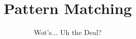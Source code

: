 \documentclass{beamer}
\title{Pattern Matching}
\subtitle{Wot's... Uh the Deal?}
\date{}
\begin{document}
\frame{\titlepage}
\end{document}
